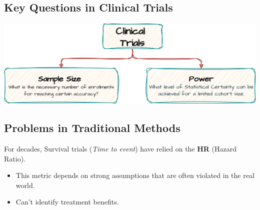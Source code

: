 \documentclass[a0,landscape]{a0poster}
\begin{document}
\begin{minipage}[t]{0.48\linewidth}

    \subsection*{\huge Key Questions in Clinical Trials}
    \begin{center}
        \includegraphics[width=0.9\linewidth]{images/diag-CT.png}
    \end{center}

    \subsection*{\Large Problems in Traditional Methods}
    \large For decades, Survival trials (\textit{Time to event}) have relied on the \textbf{HR} (Hazard Ratio).
    \begin{itemize}
        \item[\large\checkmark] This metric depends on strong assumptions that are often violated in the real world.
        \item[\large\checkmark] Can't identify treatment benefits.
    \end{itemize}


\end{minipage}
\end{document}
